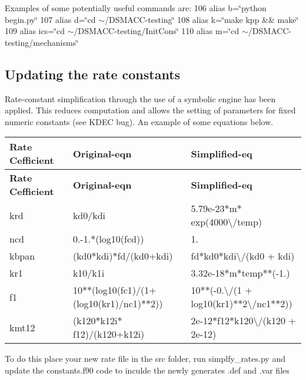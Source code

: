 Examples of some potentially useful commands are\+: 106 alias b=\char`\"{}python begin.\+py\char`\"{} 107 alias d=\char`\"{}cd $\sim$/\+D\+S\+M\+A\+C\+C-\/testing\char`\"{} 108 alias k=\char`\"{}make kpp \&\& make\char`\"{} 109 alias ics=\char`\"{}cd $\sim$/\+D\+S\+M\+A\+C\+C-\/testing/\+Init\+Cons\char`\"{} 110 alias m=\char`\"{}cd $\sim$/\+D\+S\+M\+A\+C\+C-\/testing/mechanisms\char`\"{}

\subsection*{Updating the rate constants}

Rate-\/constant simplification through the use of a symbolic engine has been applied. This reduces computation and allows the setting of parameters for fixed numeric constants (see K\+D\+EC bug). An example of some equations below.

\tabulinesep=1mm
\begin{longtabu} spread 0pt [c]{*{3}{|X[-1]}|}
\hline
\rowcolor{\tableheadbgcolor}\textbf{ Rate Cefficient  }&\textbf{ Original-\/eqn  }&\textbf{ Simplified-\/eq   }\\
\endfirsthead
\hline
\endfoot
\hline
\rowcolor{\tableheadbgcolor}\textbf{ Rate Cefficient  }&\textbf{ Original-\/eqn  }&\textbf{ Simplified-\/eq   }\\
\endhead
krd  &kd0/kdi  &5.\+79e-\/23$\ast$m$\ast$exp(4000\textbackslash{}/temp)   \\
ncd  &0.-\/1.$\ast$(log10(fcd))  &1.   \\
kbpan  &(kd0$\ast$kdi)$\ast$fd/(kd0+kdi)  &fd$\ast$kd0$\ast$kdi\textbackslash{}/(kd0 + kdi)   \\
kr1  &k10/k1i  &3.\+32e-\/18$\ast$m$\ast$temp$\ast$$\ast$(-\/1.)   \\
f1  &10$\ast$$\ast$(log10(fc1)/(1+(log10(kr1)/nc1)$\ast$$\ast$2))  &10$\ast$$\ast$(-\/0.\textbackslash{}/(1 + log10(kr1)$\ast$$\ast$2\textbackslash{}/nc1$\ast$$\ast$2))   \\
kmt12  &(k120$\ast$k12i$\ast$f12)/(k120+k12i)  &2e-\/12$\ast$f12$\ast$k120\textbackslash{}/(k120 + 2e-\/12)   \\
\end{longtabu}


To do this place your new rate file in the src folder, run simplfy\+\_\+rates.\+py and update the constants.\+f90 code to inculde the newly generates .def and .var files 